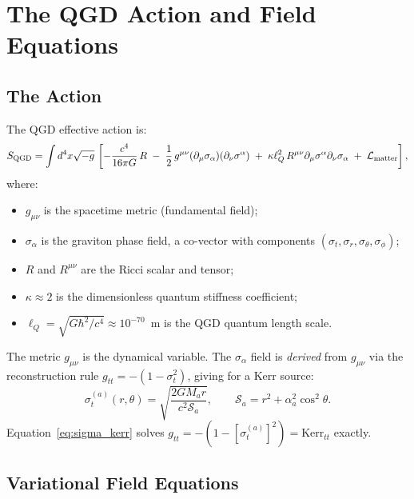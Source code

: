 \documentclass[11pt,a4paper]{article}
\theoremstyle{definition}
\theoremstyle{remark}
\newcommand{\sig}[2]{\sigma_{#1}^{(#2)}}
\newcommand{\lQ}{\ell_{Q}}
\begin{document}
	\section{The QGD Action and Field Equations}
	\label{sec:action}
	
	\subsection{The Action}
	
	The QGD effective action is:
	\begin{equation}
		S_{\rm QGD}
		= \int d^4x\sqrt{-g}\,\left[
		-\frac{c^4}{16\pi G}\,R
		\;-\;\frac{1}{2}\,g^{\mu\nu}(\partial_\mu\sigma_\alpha)(\partial_\nu\sigma^\alpha)
		\;+\;\kappa\lQ^2\,R^{\mu\nu}\partial_\mu\sigma^\alpha\partial_\nu\sigma_\alpha
		\;+\;\mathcal{L}_{\rm matter}
		\right],
		\label{eq:action}
	\end{equation}
	where:
	\begin{itemize}
		\item $g_{\mu\nu}$ is the spacetime metric (fundamental field);
		\item $\sigma_\alpha$ is the graviton phase field, a co-vector with
		components $(\sigma_t,\sigma_r,\sigma_\theta,\sigma_\phi)$;
		\item $R$ and $R^{\mu\nu}$ are the Ricci scalar and tensor;
		\item $\kappa\approx2$ is the dimensionless quantum stiffness
		coefficient;
		\item $\lQ=\sqrt{G\hbar^2/c^4}\approx10^{-70}$~m is the QGD quantum
		length scale.
	\end{itemize}
	
		The metric $g_{\mu\nu}$ is the dynamical variable.  The $\sigma_\alpha$
		field is \emph{derived} from $g_{\mu\nu}$ via the reconstruction rule
		$g_{tt}=-(1-\sigma_t^2)$, giving for a Kerr source:
		\begin{equation}
			\sig{t}{a}(r,\theta)
			= \sqrt{\frac{2GM_a r}{c^2\mathcal{S}_a}},
			\qquad \mathcal{S}_a = r^2+\alpha_a^2\cos^2\theta.
			\label{eq:sigma_kerr}
		\end{equation}
		Equation~\eqref{eq:sigma_kerr} solves $g_{tt}=-(1-[\sig{t}{a}]^2)=\text{Kerr}_{tt}$ exactly.
	
	\subsection{Variational Field Equations}
	
\end{document}
